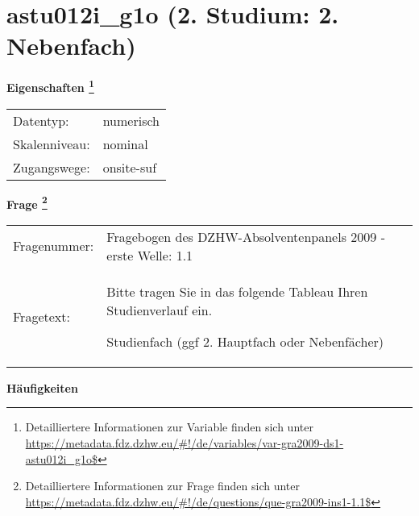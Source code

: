 
    \setcounter{footnote}{0}

    \vspace*{-1.8cm}
	\section{astu012i\_g1o (2. Studium: 2. Nebenfach)}
	\label{section:astu012i_g1o}



    \vspace*{0.5cm}
    \noindent\textbf{Eigenschaften
	\footnote{Detailliertere Informationen zur Variable finden sich unter
		\url{https://metadata.fdz.dzhw.eu/\#!/de/variables/var-gra2009-ds1-astu012i_g1o$}}}\\
	\begin{tabularx}{\hsize}{@{}lX}
	Datentyp: & numerisch \\
	Skalenniveau: & nominal \\
	Zugangswege: &
	  onsite-suf
 \\
    \end{tabularx}



				\vspace*{0.5cm}
                \noindent\textbf{Frage
	                \footnote{Detailliertere Informationen zur Frage finden sich unter
		              \url{https://metadata.fdz.dzhw.eu/\#!/de/questions/que-gra2009-ins1-1.1$}}}\\
				\begin{tabularx}{\hsize}{@{}lX}
					Fragenummer: &
					  Fragebogen des DZHW-Absolventenpanels 2009 - erste Welle:
					  1.1
 \\
					Fragetext: & Bitte tragen Sie in das folgende Tableau Ihren Studienverlauf ein.\par  Studienfach (ggf 2. Hauptfach oder Nebenfächer) \\
				\end{tabularx}





        		\vspace*{0.5cm}
                \noindent\textbf{Häufigkeiten}

